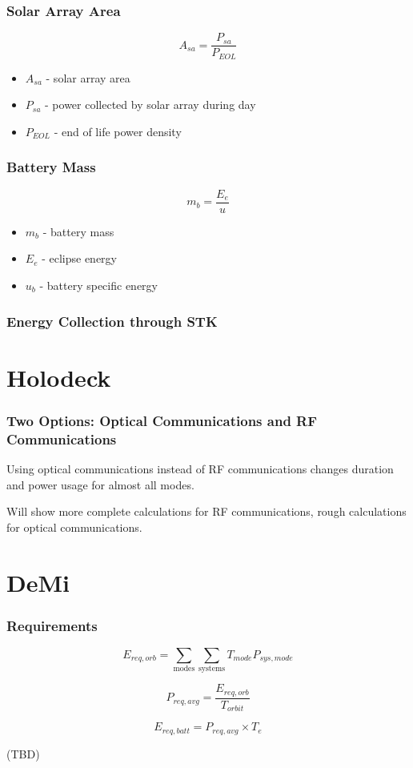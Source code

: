 \documentclass{beamer}
\begin{document}
\begin{frame}
  \frametitle{Solar Array Area}
  \[A_{sa} = \frac{P_{sa}}{P_{EOL}}\]

  \begin{itemize}
    \item $A_{sa}$ - solar array area
    \item $P_{sa}$ - power collected by solar array during day
    \item $P_{EOL}$ - end of life power density
  \end{itemize}
\end{frame}

\begin{frame}
  \frametitle{Battery Mass}
  \[m_b = \frac{E_e}{u}\]

  \begin{itemize}
    \item $m_b$ - battery mass
    \item $E_e$ - eclipse energy
    \item $u_b$ - battery specific energy
  \end{itemize}
\end{frame}

\begin{frame}
  \frametitle{Energy Collection through STK}
\end{frame}

\section{Holodeck}
\begin{frame}
  \frametitle{Two Options: Optical Communications and RF Communications}
  \begin{center}
    Using optical communications instead of RF communications changes
    duration and power usage for almost all modes.

    Will show more complete calculations for RF communications, rough
    calculations for optical communications.
  \end{center}
\end{frame}

\section{DeMi}

\begin{frame}
	\frametitle{Requirements}

		
	\[ E_{req,orb} = \sum_\text{modes}{\sum_\text{systems}{T_{mode}P_{sys,mode}}} \]
	
	\[  P_{req,avg} = \frac{E_{req,orb}}{T_{orbit}} \]
	
	\[ E_{req,batt} = P_{req,avg} \times T_e\]
	
	(TBD)
	
\end{frame}
\end{document}
